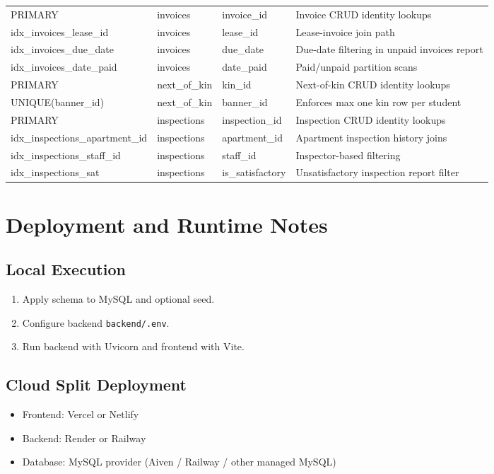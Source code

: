 \documentclass[11pt,a4paper]{article}
\begin{document}
\begin{longtable}{>{\raggedright\arraybackslash}p{} >{\raggedright\arraybackslash}p{} >{\raggedright\arraybackslash}p{} >{\raggedright\arraybackslash}p{}}
PRIMARY & invoices & invoice\_id & Invoice CRUD identity lookups \\
idx\_invoices\_lease\_id & invoices & lease\_id & Lease-invoice join path \\
idx\_invoices\_due\_date & invoices & due\_date & Due-date filtering in unpaid invoices report \\
idx\_invoices\_date\_paid & invoices & date\_paid & Paid/unpaid partition scans \\
PRIMARY & next\_of\_kin & kin\_id & Next-of-kin CRUD identity lookups \\
UNIQUE(banner\_id) & next\_of\_kin & banner\_id & Enforces max one kin row per student \\
PRIMARY & inspections & inspection\_id & Inspection CRUD identity lookups \\
idx\_inspections\_apartment\_id & inspections & apartment\_id & Apartment inspection history joins \\
idx\_inspections\_staff\_id & inspections & staff\_id & Inspector-based filtering \\
idx\_inspections\_sat & inspections & is\_satisfactory & Unsatisfactory inspection report filter \\
\bottomrule
\end{longtable}

\section{Deployment and Runtime Notes}
\subsection{Local Execution}
\begin{enumerate}
  \item Apply schema to MySQL and optional seed.
  \item Configure backend \texttt{backend/.env}.
  \item Run backend with Uvicorn and frontend with Vite.
\end{enumerate}

\subsection{Cloud Split Deployment}
\begin{itemize}
  \item Frontend: Vercel or Netlify
  \item Backend: Render or Railway
  \item Database: MySQL provider (Aiven / Railway / other managed MySQL)
\end{itemize}
\end{document}
